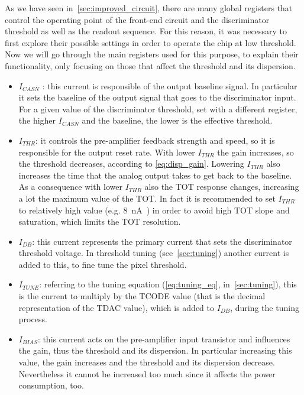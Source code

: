 As we have seen in~\autoref{sec:improved_circuit}, there are many global registers that control the operating point of the front-end circuit and the discriminator threshold as well as the readout sequence. For this reason, it was necessary to first explore their possible settings in order to operate the chip at low threshold.\\

Now we will go through the main registers used for this purpose, to explain their functionality, only focusing on those that affect the threshold and its dispersion.


\begin{itemize}
\label{currents}
\item \textit{$I_{CASN}$} : this current is responsible of the output baseline signal. In particular it sets the baseline of the output signal that goes to the discriminator input. For a given value of the discriminator threshold, set with a different register, the higher \textit{$I_{CASN}$} and the baseline, the lower is the effective threshold. 
\item \textit{$I_{THR}$}: it controls the pre-amplifier feedback strength and speed, so it is responsible for the output reset rate. With lower $I_{THR}$ the gain increases, so the threshold decreases, according to \autoref{eq:disp_gain}. Lowering $I_{THR}$ also increases the time that the analog output takes to get back to the baseline. As a consequence with lower \textit{$I_{THR}$} also the TOT response changes, increasing a lot the maximum value of the TOT. In fact it is recommended to set $I_{THR}$ to relatively high value (e.g. \SI{8}{nA}~\cite{Moustakas:2021gjr}) in order to avoid high TOT slope and saturation, which limits the TOT resolution.
\item \textit{$I_{DB}$}: this current represents the primary current that sets the discriminator threshold voltage. In threshold tuning (see~\autoref{sec:tuning}) another current is added to this, to fine tune the pixel threshold.
\item \textit{$I_{TUNE}$}: 
referring to the tuning equation (\autoref{eq:tuning_eq}, in~\autoref{sec:tuning}), this is the current to multiply by the TCODE value (that is the decimal representation of the TDAC value), which is added to $I_{DB}$, during the tuning process.
\item \textit{$I_{BIAS}$}: this current acts on the pre-amplifier input transistor and influences the gain, thus the threshold and its dispersion. In particular increasing this value, the gain increases and the threshold and its dispersion decrease. Nevertheless it cannot be increased too much since it affects the power consumption, too.
\end{itemize}


